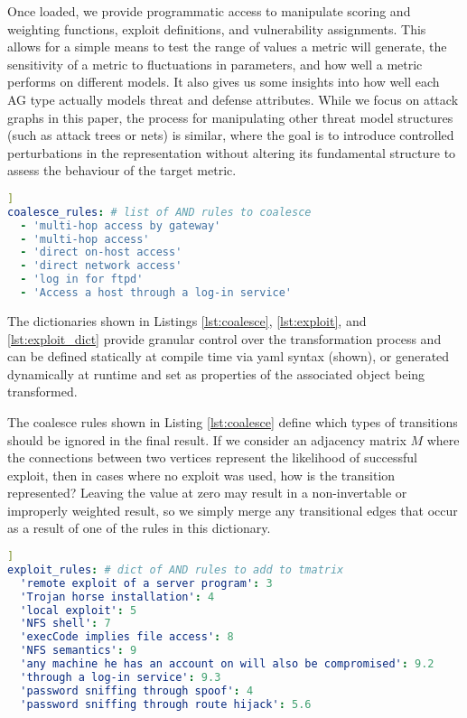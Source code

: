 Once loaded, we provide programmatic access to manipulate scoring and weighting functions, exploit definitions, and vulnerability assignments. This allows for a simple means to test the range of values a metric will generate, the sensitivity of a metric to fluctuations in parameters, and how well a metric performs on different models. It also gives us some insights into how well each AG type actually models threat and defense attributes. While we focus on attack graphs in this paper, the process for manipulating other threat model structures (such as attack trees or nets) is similar, where the goal is to introduce controlled perturbations in the representation without altering its fundamental structure to assess the behaviour of the target metric.

\begin{minipage}{.95\linewidth}
\begin{lstlisting}[language=yaml, label={lst:coalesce}, caption={Node Labels to Coalesce},captionpos=b, ]]
coalesce_rules: # list of AND rules to coalesce
  - 'multi-hop access by gateway'
  - 'multi-hop access'
  - 'direct on-host access'
  - 'direct network access'
  - 'log in for ftpd'
  - 'Access a host through a log-in service'
  \end{lstlisting}
\end{minipage}

The dictionaries shown in Listings \ref{lst:coalesce}, \ref{lst:exploit}, and \ref{lst:exploit_dict} provide granular control over the transformation process and can be defined statically at compile time via yaml syntax (shown), or generated dynamically at runtime and set as properties of the associated object being transformed. 

The coalesce rules shown in Listing \ref{lst:coalesce} define which types of transitions should be ignored in the final result. If we consider an adjacency matrix $M$ where the connections between two vertices represent the likelihood of successful exploit, then in cases where no exploit was used, how is the transition represented? Leaving the value at zero may result in a non-invertable or improperly weighted result, so we simply merge any transitional edges that occur as a result of one of the rules in this dictionary.

\begin{minipage}{.94\linewidth}
\begin{lstlisting}[language=yaml, label={lst:exploit}, caption={Fixed Scores for Exploit Classes},captionpos=b, ]]
exploit_rules: # dict of AND rules to add to tmatrix
  'remote exploit of a server program': 3
  'Trojan horse installation': 4
  'local exploit': 5
  'NFS shell': 7
  'execCode implies file access': 8
  'NFS semantics': 9
  'any machine he has an account on will also be compromised': 9.2
  'through a log-in service': 9.3
  'password sniffing through spoof': 4
  'password sniffing through route hijack': 5.6
\end{lstlisting}
\end{minipage}

